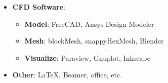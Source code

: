 {\begin{itemize}
    \item \textbf{CFD Software}:
      \vspace{0.5em}
      \begin{itemize}
        \setlength\itemsep{0.3em}
        \item \textbf{Model}: FreeCAD, Ansys Design Modeler
        \item \textbf{Mesh}: blockMesh, snappyHexMesh, Blender
        \item \textbf{Visualize}: Paraview, Gnuplot, Inkscape
      \end{itemize}
    \item \textbf{Other}: \LaTeX, Beamer, office, etc.
    \shorthandon{:}
  \end{itemize}
}

